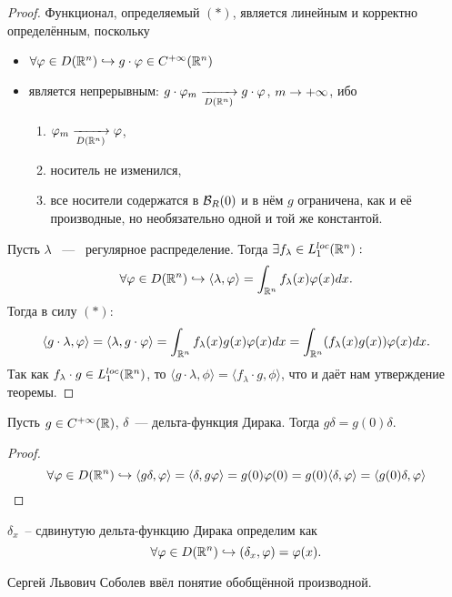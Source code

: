 \begin{proof} Функционал, определяемый $(\ast)$, является линейным и корректно определённым, поскольку
    \begin{itemize}
        \item $\forall \varphi \in D(\mathbb{R}^n) \hookrightarrow g \cdot \varphi \in C^{+\infty}(\mathbb{R}^n)$
        \item является непрерывным: $g \cdot\varphi_m \xrightarrow[D(\mathbb{R}^n)]{} g \cdot \varphi$, $m \rightarrow +\infty$, ибо  
        \begin{enumerate}
            \item $\varphi_m \xrightarrow[D(\mathbb{R}^n)]{} \varphi$,
            \item носитель не изменился,
            \item все носители содержатся в $\mathcal{B}_R(0)$ и в нём $g$ ограничена, как и её производные, но необязательно одной и той же константой.
        \end{enumerate}
    \end{itemize}
    Пусть $\lambda$ ~---~ регулярное распределение.
    Тогда $\exists f_\lambda \in L_1^{loc}(\mathbb{R}^n):$ 
    \[
        \forall \varphi \in D(\mathbb{R}^n) \hookrightarrow \langle \lambda, \varphi \rangle = \int_{\mathbb{R}^n} f_{\lambda}(x) \varphi(x) dx.
    \]
    Тогда в силу $(\ast)$:
    \[
        \langle g \cdot \lambda, \varphi \rangle = \langle\lambda, g \cdot \varphi \rangle = \int_{\mathbb{R}^n} f_{\lambda}(x) g(x) \varphi(x) dx = \int_{\mathbb{R}^n} (f_\lambda(x) g(x))\varphi(x)dx.
    \]
    Так как $f_\lambda \cdot g \in L_1^{loc}(\mathbb{R}^n)$, то $\langle g \cdot \lambda, \phi \rangle  = \langle f_\lambda \cdot g, \phi \rangle $, что и даёт нам утверждение теоремы.
\end{proof}
\begin{example}
    Пусть $g \in C^{+\infty}(\mathbb{R})$, $\delta$~--- дельта-функция Дирака. Тогда $g\delta = g(0)\delta$.
    \begin{proof}
        \[ \forall \varphi \in D(\mathbb{R}^n) \hookrightarrow
        \langle g \delta, \varphi \rangle  = \langle \delta, g \varphi \rangle = g(0)\varphi(0) = g(0) \langle \delta, \varphi \rangle = \langle g(0)\delta, \varphi \rangle 
        \]
    \end{proof} 
\end{example}
\begin{definition}
    $\delta_x$~-- сдвинутую дельта-функцию Дирака определим как
    \[
        \forall \varphi \in D(\mathbb{R}^n) \hookrightarrow (\delta_x, \varphi) = \varphi(x).
    \]
\end{definition}
\begin{remark}
     Сергей Львович Соболев ввёл понятие обобщённой производной.
\end{remark}
